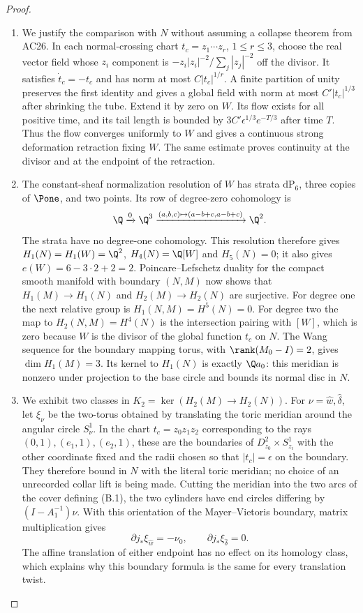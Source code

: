 \begin{proof}
\begin{enumerate}[label={$\langle1\rangle$\arabic*.},leftmargin=*]
\item We justify the comparison with $N$ without assuming a collapse
theorem from AC26. In each normal-crossing chart
$t_c=z_1\cdots z_r$, $1\le r\le3$, choose the real vector field
whose $z_i$ component is
$-z_i|z_i|^{-2}/\sum_j|z_j|^{-2}$ off the divisor.
It satisfies $\dot t_c=-t_c$ and has norm at most
$C|t_c|^{1/r}$. A finite partition of unity preserves the first
identity and gives a global field with norm at most
$C'|t_c|^{1/3}$ after shrinking the tube. Extend it by zero on $W$.
Its flow exists for all positive time, and its tail length is
bounded by $3C'\epsilon^{1/3}e^{-T/3}$ after time $T$.
Thus the flow converges uniformly to $W$ and gives a continuous
strong deformation retraction fixing $W$. The same estimate proves
continuity at the divisor and at the endpoint of the retraction.

\item The constant-sheaf normalization resolution of $W$ has strata
$\mathrm{dP}_6$, three copies of $\Pone$, and two points.
Its row of degree-zero cohomology is
\[
 \Q\xrightarrow{0}\Q^3
 \xrightarrow{(a,b,c)\mapsto(a-b+c,a-b+c)}\Q^2.
\]
The strata have no degree-one cohomology. This resolution therefore
gives $H_1(N)=H_1(W)=\Q^2$, $H_4(N)=\Q[W]$ and $H_5(N)=0$;
it also gives $e(W)=6-3\cdot2+2=2$.
Poincare--Lefschetz duality for the compact smooth manifold with
boundary $(N,M)$ now shows that $H_1(M)\to H_1(N)$ and
$H_2(M)\to H_2(N)$ are surjective. For degree one the next
relative group is $H_1(N,M)=H^5(N)=0$.
For degree two the map to $H_2(N,M)=H^4(N)$ is the intersection
pairing with $[W]$, which is zero because $W$ is the divisor of
the global function $t_c$ on $N$. The Wang sequence for the
boundary mapping torus, with $\rank(M_0-I)=2$, gives
$\dim H_1(M)=3$. Its kernel to $H_1(N)$ is exactly
$\Q a_0$: this meridian is nonzero under projection to the base
circle and bounds its normal disc in $N$.

\item We exhibit two classes in
$K_2=\ker(H_2(M)\to H_2(N))$.
For $\nu=\hat w,\hat\delta$, let $\xi_\nu$ be the two-torus
obtained by translating the toric meridian around the angular
circle $S^1_\nu$. In the chart $t_c=z_0z_1z_2$ corresponding to
the rays $(0,1),(e_1,1),(e_2,1)$, these are the boundaries of
$D^2_{z_0}\times S^1_{z_i}$ with the other coordinate fixed
and the radii chosen so that $|t_c|=\epsilon$ on the boundary.
They therefore bound in $N$ with the literal toric meridian;
no choice of an unrecorded collar lift is being made.
Cutting the meridian into the two arcs of the cover defining
(B.1), the two cylinders have end circles differing by
$(I-A_1^{-1})\nu$. With this orientation of the Mayer--Vietoris
boundary, matrix multiplication gives
\[
 \partial j_*\xi_{\hat w}=-\nu_0,\qquad
 \partial j_*\xi_{\hat\delta}=0.                       \tag{B.3}
\]
The affine translation of either endpoint has no effect on its
homology class, which explains why this boundary formula is the
same for every translation twist.


\end{enumerate}
\end{proof}
